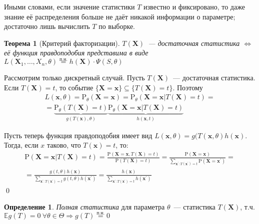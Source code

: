 \documentclass[oneside,final,14pt]{extreport}
\renewenvironment{proof}{{\bfseries Доказательство.}}{\qed}
\newtheorem{thm}{Теорема}[section]
\theoremstyle{definition}
\newtheorem{defn}{Определение}[section]
\begin{document}
Иными словами, если значение статистики $T$ известно и фиксировано, то даже знание её распределения больше не даёт никакой информации о параметре; достаточно лишь вычислить $T$ по выборке.

\begin{thm}[Критерий факторизации]
$T(\mathbf{X})$~--- достаточная статистика $\Leftrightarrow$ её функция правдоподобия представима в виде $L(\mathbf{X}_{1}, \ldots, X_{n} , \theta) \stackrel{\text{п.н.}}{=} h(\mathbf{X}) \cdot \Psi(S, \theta)$
\end{thm}

\begin{proof}
Рассмотрим только дискретный случай. Пусть $T(\mathbf{X})$~--- достаточная статистика. Если $T(\mathbf{X})=t$, то событие $\{\mathbf{X}=\mathbf{x}\} \subseteq \{T(\mathbf{X})=t\}$. Поэтому
\begin{multline*}
    L(\mathbf{x}, \theta) = \mathrm{P}_{\theta}(\mathbf{X}=\mathbf{x})=\mathrm{P}_{\theta}(\mathbf{X}=\mathbf{x} | T(\mathbf{X})=t) =\\
    = \underbrace{\mathrm{P}_{\theta}(T(\mathbf{X})=t)}_{g(T(\mathbf{x}), \theta)} \underbrace{\mathrm{P}_{\theta}(\mathbf{X}=\mathbf{x} | T(\mathbf{X})=t)}_{h(\mathbf{x}, t)}
\end{multline*}

Пусть теперь функция правдоподобия имеет вид $L(\mathbf{x}, \theta)=g(T(\mathbf{x}, \theta) h(\mathbf{x})$. Тогда, если $x$ таково, что $T(\mathbf{x})=t$, то:
\begin{multline*}
    \mathrm{P}(\mathbf{X}=\mathbf{x} | T(\mathbf{X})=t) =\frac{\mathrm{P}(\mathbf{X}=\mathbf{x}, T(\mathbf{X})=t)}{\mathrm{P}(T(\mathbf{X})=t)}
    =\frac{\mathrm{P}(\mathbf{X}=\mathbf{x})}{\sum_{\mathbf{x}^{\prime}: T(\mathbf{x}^{\prime})=t} \mathrm{P}(\mathbf{X}=\mathbf{x}^{\prime})} = \\
    = \frac{g(t, \theta) h(\mathbf{x})}{\sum_{\mathbf{x}^{\prime}: T(\mathbf{x}^{\prime})=t} g(t, \theta) h(\mathbf{x}^{\prime})}
    = \frac{h(\mathbf{x})}{\sum\limits_{\mathbf{x}^{\prime}: T(\mathbf{x}^{\prime})=t} h(\mathbf{x}^{\prime})}
\end{multline*}
\end{proof}

\begin{defn}
{\it Полная статистика} для параметра $\theta$~--- статистика $T(\mathbf{X})$, т.ч. $\mathbb{E} g(T)=0~\forall \theta \in \Theta \Rightarrow g(T) \stackrel{\text{п.н.}}{=}0$
\end{defn}
\end{document}
